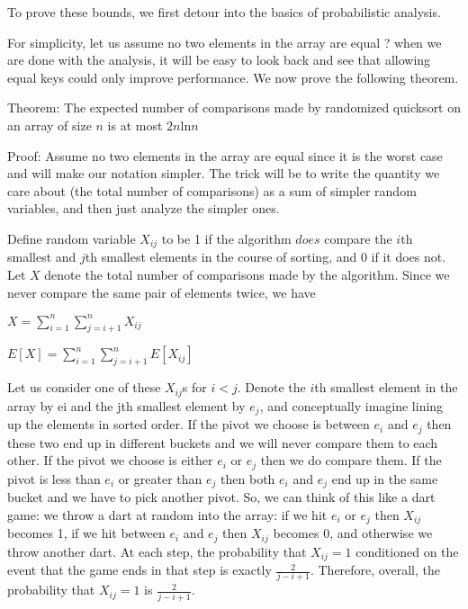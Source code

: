 \documentclass[12pt]{article}
\begin{document}
To prove these bounds, we first detour into the basics of probabilistic analysis.
  
  For simplicity, let us assume no two elements in the array are equal ? when we are done with the analysis, it will be easy to look back and see that allowing equal keys could only improve performance. We now prove the following theorem.
  
 Theorem: The expected number of comparisons made by randomized quicksort on an array of size $n$ is at most $2n$ln$n$
 
 Proof:  Assume no two elements in the array are equal since it is the worst case and will make our notation simpler. The trick will be to write the quantity we care about (the total number of comparisons) as a sum of simpler random variables, and then just analyze the simpler ones.
 
 Define random variable $X_{ij}$ to be 1 if the algorithm $does$ compare the $i$th smallest and $j$th smallest elements in the course of sorting, and 0 if it does not. Let $X$ denote the total number of comparisons made by the algorithm. Since we never compare the same pair of elements twice, we have
 
 
\begin{center}
   $\displaystyle X = \sum_{i=1} ^{n} \sum_{j=i+1} ^{n} {X_{ij}} $
   
   $\displaystyle E[X] = \sum_{i=1} ^{n} \sum_{j=i+1} ^{n} {E[X_{ij}]} $
\end{center}

Let us consider one of these $X_{ij}$s for $i < j$. Denote the $i$th smallest element in the array by ei and the jth smallest element by $e_j$, and conceptually imagine lining up the elements in sorted order. If the pivot we choose is between $e_i$ and $e_j$ then these two end up in different buckets and we will never compare them to each other. If the pivot we choose is either $e_i$ or $e_j$ then we do compare them. If the pivot is less than $e_i$ or greater than $e_j$ then both $e_i$ and $e_j$ end up in the same bucket and we have to pick another pivot. So, we can think of this like a dart game: we throw a dart at random into the array: if we hit $e_i$ or $e_j$ then $X_{ij}$ becomes 1, if we hit between $e_i$ and $e_j$ then $X_{ij}$ becomes 0, and otherwise we throw another dart. At each step, the probability that $X_{ij} = 1$ conditioned on the event that the game ends in that step is exactly $\displaystyle \frac 2 {j - i + 1}$. Therefore, overall, the probability that $X_{ij} = 1$ is $\displaystyle \frac 2 {j - i + 1}$.
\end{document}
